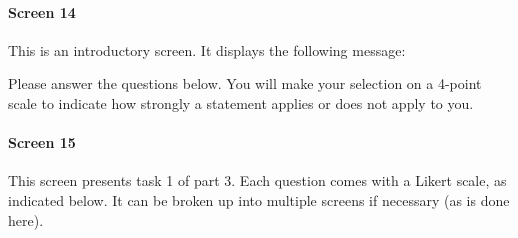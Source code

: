 \documentclass[11pt]{article}
\begin{document}
\paragraph{Screen 14} This is an introductory screen. It displays the following message:

\begin{tcolorbox}
Please answer the questions below. You will make your selection on a 4-point scale to indicate how strongly a statement applies or does not apply to you.
\end{tcolorbox}

\paragraph{Screen 15} This screen presents task 1 of part 3. Each question comes with a Likert scale, as indicated below. It can be broken up into multiple screens if necessary (as is done here).
\end{document}
